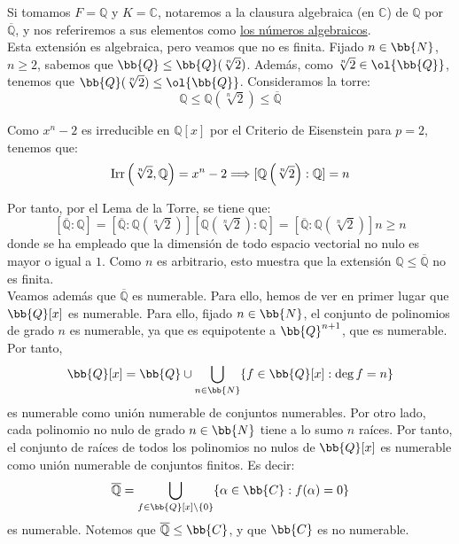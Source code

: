 \begin{ejemplo}
    Si tomamos $F = \mathbb{Q}$ y $K = \mathbb{C}$, notaremos a la clausura algebraica (en $\mathbb{C}$) de $\mathbb{Q}$ por $\overline{\mathbb{Q}}$, y nos referiremos a sus elementos como \underline{los números algebraicos}.\\

    Esta extensión es algebraica, pero veamos que no es finita. Fijado $n\in \bb{N}$, $n\geq 2$, sabemos que $\bb{Q}\leq \bb{Q}(\sqrt[n]{2})$. Además, como $\sqrt[n]{2}\in \ol{\bb{Q}}$, tenemos que $\bb{Q}(\sqrt[n]{2})\leq \ol{\bb{Q}}$. Consideramos la torre:
    \begin{equation*}
        \mathbb{Q} \leq \mathbb{Q}\left(\sqrt[n]{2}\right) \leq \overline{\mathbb{Q}}
    \end{equation*}

    Como $x^n-2$ es irreducible en $\mathbb{Q}[x]$ por el Criterio de Eisenstein para $p=2$, tenemos que:
    \begin{equation*}
        \operatorname{Irr}\left(\sqrt[n]{2}, \mathbb{Q}\right) = x^n-2
        \Longrightarrow
        [\mathbb{Q}\left(\sqrt[n]{2}\right):\mathbb{Q}] = n
    \end{equation*}

    Por tanto, por el Lema de la Torre, se tiene que:
    \begin{equation*}
        \left[\overline{\mathbb{Q}}:\mathbb{Q}\right] = \left[\overline{\mathbb{Q}}:\mathbb{Q}\left(\sqrt[n]{2}\right)\right][\mathbb{Q}\left(\sqrt[n]{2}\right):\mathbb{Q}] = \left[\overline{\mathbb{Q}}:\mathbb{Q}\left(\sqrt[n]{2}\right)\right]n \geq n
    \end{equation*}
    donde se ha empleado que la dimensión de todo espacio vectorial no nulo es mayor o igual a $1$. Como $n$ es arbitrario, esto muestra que la extensión $\mathbb{Q}\leq \overline{\mathbb{Q}}$ no es finita.\\

    Veamos además que $\overline{\mathbb{Q}}$ es numerable. Para ello, hemos de ver en primer lugar que $\bb{Q}[x]$ es numerable. Para ello, fijado $n\in \bb{N}$, el conjunto de polinomios de grado $n$ es numerable, ya que es equipotente a $\bb{Q}^{n+1}$, que es numerable. Por tanto,
    $$\bb{Q}[x] = \bb{Q} \cup \bigcup_{n\in \bb{N}} \{f\in \bb{Q}[x] : \deg f = n\}$$
    es numerable como unión numerable de conjuntos numerables. Por otro lado, cada polinomio no nulo de grado $n\in \bb{N}$ tiene a lo sumo $n$ raíces. Por tanto, el conjunto de raíces de todos los polinomios no nulos de $\bb{Q}[x]$ es numerable como unión numerable de conjuntos finitos. Es decir:
    \begin{equation*}
        \overline{\mathbb{Q}} = \bigcup_{f\in \bb{Q}[x]\setminus \{0\}} \{\alpha\in \bb{C} : f(\alpha) = 0\}
    \end{equation*}
    es numerable. Notemos que $\overline{\mathbb{Q}}\leq \bb{C}$, y que $\bb{C}$ es no numerable.
\end{ejemplo}

